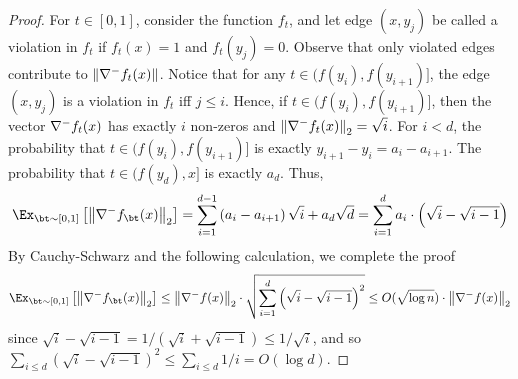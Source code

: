 \begin{proof}
For $t \in [0, 1]$, consider the function $f_t$, and let edge $(x,y_j)$ be called a violation in $f_t$ if $f_t(x) = 1$ and $f_t(y_j) = 0$.
Observe that only violated edges contribute to $\left\lVert \nabla^-f_t(x) \right\rVert$. 
Notice that for any $t \in (f(y_i), f(y_{i+1})]$, the edge $(x,y_j)$ is a violation in $f_t$ iff $j \leq i$.
Hence, if $t \in (f(y_i), f(y_{i+1})]$, then the vector $\nabla^-f_t(x)$ 
has exactly $i$ non-zeros and $\left\lVert \nabla^- f_t(x) \right\rVert_2 = \sqrt{i}$. For $i < d$, the probability that $t \in (f(y_i), f(y_{i+1})]$
is exactly $y_{i+1} - y_i = a_i - a_{i+1}$. The probability that $t \in (f(y_d), x]$
is exactly $a_d$.
% 	
Thus,
\[
	\Ex_{\bt\sim[0,1]}\left[ 	\norm{\grad^- f_{\bt}(x)}_2 \right] = \sum_{i=1}^{d-1} \left(a_i - a_{i+1}\right)\sqrt{i} + a_d \sqrt{d} = \sum_{i=1}^d a_i \cdot \left(\sqrt{i} - \sqrt{i-1}\right)
\]
By Cauchy-Schwarz and the following calculation, we complete the proof
\begin{equation*}
	\Ex_{\bt\sim [0,1]}\left[ 	\norm{\grad^- f_{\bt}(x)}_2 \right]\leq \norm{\grad^- f(x)}_2 \cdot \sqrt{\sum_{i=1}^d \left(\sqrt{i} - \sqrt{i-1}\right)^2}\leq O(\sqrt{\log n})\cdot \norm{\grad^- f(x)}_2
\end{equation*}
since $\sqrt{i} - \sqrt{i-1} = 1/(\sqrt{i}+\sqrt{i-1}) \leq 1/\sqrt{i}$, and so $\sum_{i \leq d} (\sqrt{i} - \sqrt{i-1})^2 \leq \sum_{i \leq d} 1/i = O(\log d)$.
% 
\end{proof}

